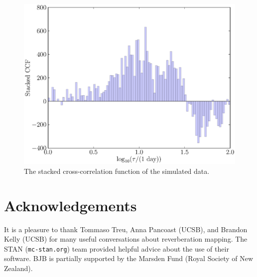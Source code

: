 \documentclass[useAMS,usenatbib]{mn2e}
\begin{document}
\begin{figure}
\begin{center}
\includegraphics[scale=0.4]{Figures/ccf.eps}
\caption{The stacked cross-correlation function of the simulated data.
\label{fig:ccf}}
\end{center}
\end{figure}



\section*{Acknowledgements}
It is a pleasure to thank Tommaso Treu, Anna Pancoast (UCSB), and
Brandon Kelly (UCSB) for many
useful conversations about reverberation mapping. The STAN ({\tt mc-stan.org})
team provided helpful advice about the use of their software. BJB is partially
supported by the Marsden Fund (Royal Society of New Zealand).
\end{document}
